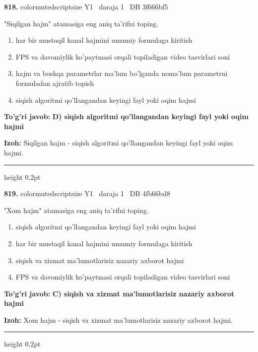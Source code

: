 \documentclass[10pt,a4paper,oneside]{article}
\begin{document}
\noindent\textbf{\color{ink}818.}  {color{muted}scriptsize Y1 \textbullet\ daraja 1 \textbullet\ DB 3f666bf5}
\par
"Siqilgan hajm" atamasiga eng aniq ta'rifni toping.
\begin{enumerate}[label=\Alph*),leftmargin=9mm]
\item har bir mustaqil kanal hajmini umumiy formulaga kiritish
\item FPS va davomiylik ko'paytmasi orqali topiladigan video tasvirlari soni
\item hajm va boshqa parametrlar ma'lum bo'lganda noma'lum parametrni formuladan ajratib topish
\item siqish algoritmi qo'llangandan keyingi fayl yoki oqim hajmi
\end{enumerate}
\begin{tcolorbox}[enhanced,breakable,colback=teal!4,colframe=teal!50!black,boxrule=0.5pt,arc=1.1mm,left=3mm,right=3mm,top=1.7mm,bottom=1.7mm,before skip=2mm,after skip=2mm]
\textbf{\color{teal}To'g'ri javob:} \textbf{D) siqish algoritmi qo'llangandan keyingi fayl yoki oqim hajmi}
\par\smallskip
\textbf{Izoh:} Siqilgan hajm - siqish algoritmi qo'llangandan keyingi fayl yoki oqim hajmi.
\end{tcolorbox}
\vspace{2mm}\hrule height 0.2pt \vspace{3mm}

\noindent\textbf{\color{ink}819.}  {color{muted}scriptsize Y1 \textbullet\ daraja 1 \textbullet\ DB 4fb66bd8}
\par
"Xom hajm" atamasiga eng aniq ta'rifni toping.
\begin{enumerate}[label=\Alph*),leftmargin=9mm]
\item siqish algoritmi qo'llangandan keyingi fayl yoki oqim hajmi
\item har bir mustaqil kanal hajmini umumiy formulaga kiritish
\item siqish va xizmat ma'lumotlarisiz nazariy axborot hajmi
\item FPS va davomiylik ko'paytmasi orqali topiladigan video tasvirlari soni
\end{enumerate}
\begin{tcolorbox}[enhanced,breakable,colback=teal!4,colframe=teal!50!black,boxrule=0.5pt,arc=1.1mm,left=3mm,right=3mm,top=1.7mm,bottom=1.7mm,before skip=2mm,after skip=2mm]
\textbf{\color{teal}To'g'ri javob:} \textbf{C) siqish va xizmat ma'lumotlarisiz nazariy axborot hajmi}
\par\smallskip
\textbf{Izoh:} Xom hajm - siqish va xizmat ma'lumotlarisiz nazariy axborot hajmi.
\end{tcolorbox}
\vspace{2mm}\hrule height 0.2pt \vspace{3mm}
\end{document}
